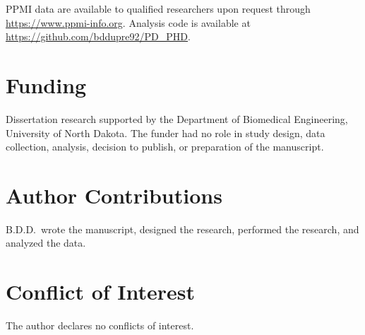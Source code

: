 PPMI data are available to qualified researchers upon request through
\url{https://www.ppmi-info.org}. Analysis code is available at
\url{https://github.com/bddupre92/PD_PHD}.


\section*{Funding}

Dissertation research supported by the Department of Biomedical Engineering, University of North Dakota. The funder had no role in study design, data collection, analysis, decision to publish, or preparation of the manuscript.


\section*{Author Contributions}

B.D.D.\ wrote the manuscript, designed the research, performed the research, and analyzed the data.


\section*{Conflict of Interest}

The author declares no conflicts of interest.


